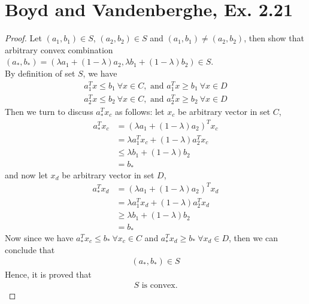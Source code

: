 \documentclass[11pt,a4paper]{article}
\begin{document}
\section{Boyd and Vandenberghe, Ex. 2.21}
\begin{proof}
    Let $(a_1, b_1) \in S$, $(a_2, b_2) \in S$ and $(a_1, b_1) \not = (a_2, b_2)$, then
    show that arbitrary convex combination $(a_{*}, b_{*}) = (\lambda a_1 +
    (1-\lambda) a_2, \lambda b_1 + (1-\lambda) b_2) \in S$. \\
    By definition of set $S$, we have
    \begin{align}
        a_1^T x \leq b_1\ \forall x \in C, \text{ and } a_1^T x \geq b_1\ \forall x \in D \\
        a_2^T x \leq b_2\ \forall x \in C, \text{ and } a_2^T x \geq b_2\ \forall x \in D 
    \end{align}
    Then we turn to discuss $a_{*}^T x_c$ as follows: let $x_c$ be arbitrary
    vector in set $C$, 
    \begin{align}
        a_{*}^T x_c &= (\lambda a_1 + (1-\lambda) a_2)^T x_c \\
        &= \lambda a_1^T x_c + (1-\lambda) a_2^Tx_c \\
        &\leq \lambda b_1 + (1-\lambda) b_2 \\
        &= b_{*}
    \end{align}
    and now let $x_d$ be arbitrary vector in set $D$,
    \begin{align}
        a_{*}^T x_d &= (\lambda a_1 + (1-\lambda) a_2)^T x_d \\
        &= \lambda a_1^T x_d + (1-\lambda) a_2^Tx_d \\
        &\geq \lambda b_1 + (1-\lambda) b_2 \\
        &= b_{*}
    \end{align}
    Now since we have $a_{*}^T x_c \leq b_{*}\ \forall x_c \in C$ and 
    $a_{*}^T x_d \geq b_{*}\ \forall x_d \in D$, then we can conclude that 
    \begin{align}
        (a_{*}, b_{*}) \in S
    \end{align}
    Hence, it is proved that 
    \begin{align}
        S \text{ is convex.}
    \end{align}
\end{proof}

\newpage
\setcounter{section}{6}
\end{document}
